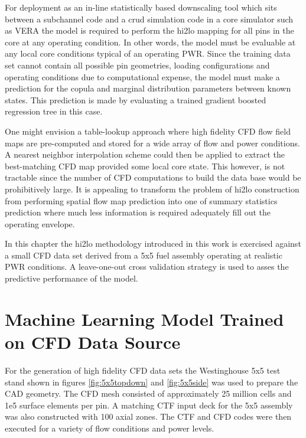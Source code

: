 \label{sec:ml_cfd}

For deployment as an in-line statistically based downscaling tool which sits between a subchannel code and a crud simulation code in a core simulator such as VERA the model is required to perform the hi2lo mapping for all pins in the core at any operating condition.  In other words, the model must be evaluable at any local core conditions typical of an operating PWR.  Since the training data set cannot contain all possible pin geometries, loading configurations and operating conditions due to computational expense, the model must make a prediction for the copula and marginal distribution parameters between known states.  This prediction is made by evaluating a trained gradient boosted regression tree in this case.

One might envision a table-lookup approach where high fidelity CFD flow field maps are pre-computed and stored for a wide array of flow and power conditions.  A nearest neighbor interpolation scheme could then be applied to extract the best-matching CFD map provided some local core state.  This however, is not tractable since the number of CFD computations to build the data base would be prohibitively large.  It is appealing to transform the problem of hi2lo construction from performing spatial flow map prediction into one of summary statistics prediction where much less information is required adequately fill out the operating envelope.  

In this chapter the hi2lo methodology introduced in this work is exercised against a small CFD data set derived from a 5x5 fuel assembly operating at realistic PWR conditions.  A leave-one-out cross validation strategy is used to asses the predictive performance of the model.


\section{Machine Learning Model Trained on CFD Data Source}

For the generation of high fidelity CFD data sets the Westinghouse 5x5 test stand shown in figures \ref{fig:5x5topdown} and \ref{fig:5x5side} was used to prepare the CAD geometry.  The CFD mesh consisted of approximately 25 million cells and 1e5 surface elements per pin.  A matching CTF input deck for the 5x5 assembly was also constructed with 100 axial zones.  The CTF and CFD codes were then executed for a variety of flow conditions and power levels.


